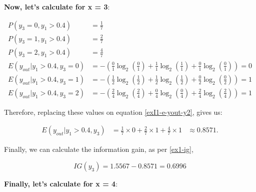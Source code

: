 \documentclass[12pt]{article}
\begin{document}
\begin{enumerate}[leftmargin=\labelsep]
    \textbf{Now, let's calculate for x = 3}:

    \[
        \begin{aligned}
            P(y_3 = 0, y_1 > 0.4)          & = \frac{1}{7}                                                                                       \\
            P(y_3 = 1, y_1 > 0.4)          & = \frac{2}{7}                                                                                       \\
            P(y_3 = 2, y_1 > 0.4)          & = \frac{4}{7}                                                                                       \\
            E(y_{out} | y_1 > 0.4 , y_3 = 0) & = - \left(\frac{0}{1} \log_2\left(\frac{0}{1}\right) + \frac{1}{1} \log_2\left(\frac{1}{1}\right)
                + \frac{0}{1} \log_2\left(\frac{0}{1}\right)\right) = 0                                                                          \\
            E(y_{out} | y_1 > 0.4 , y_3 = 1) & = - \left(\frac{1}{2} \log_2\left(\frac{1}{2}\right) + \frac{1}{2} \log_2\left(\frac{1}{2}\right)
                + \frac{0}{2} \log_2\left(\frac{0}{2}\right)\right) = 1                                                                          \\
            E(y_{out} | y_1 > 0.4 , y_3 = 2) & = - \left(\frac{2}{4} \log_2\left(\frac{2}{4}\right) + \frac{0}{4} \log_2\left(\frac{0}{4}\right)
                + \frac{2}{4} \log_2\left(\frac{2}{4}\right)\right) = 1
        \end{aligned}
    \]

    Therefore, replacing these values on equation \eqref{exI1-e-yout-y2}, gives us:

    \[
        \begin{aligned}
            E(y_{out} | y_1>0.4, y_3) & = \frac{1}{7} \times 0 + \frac{2}{7} \times 1 +  \frac{4}{7} \times 1 & \approx 0.8571.
        \end{aligned}
    \]

    Finally, we can calculate the information gain, as per \eqref{ex1-ig},

    \[
        IG(y_{3}) = 1.5567 - 0.8571 = 0.6996
    \]

    \textbf{Finally, let's calculate for x = 4}:


\end{enumerate}
\end{document}
